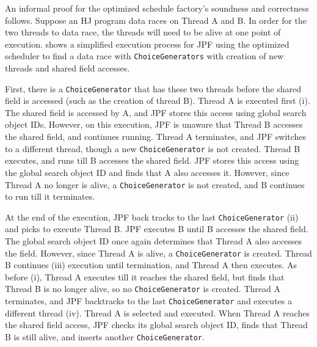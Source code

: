 
An informal proof for the optimized schedule factory's soundness and correctness follows. Suppose an HJ program data races on Thread A and B. In order for the two threads to data race, the threads will need to be alive at one point of execution.  shows a simplified execution process for JPF using the optimized scheduler to find a data race with \texttt{ChoiceGenerators} with creation of new threads and shared field accesses.

First, there is a \texttt{ChoiceGenerator} that has these two threads before the shared field is accessed (such as the creation of thread B). Thread A is executed first (i). The shared field is accessed by A, and JPF stores this access using global search object IDs. However, on this execution, JPF is unaware that Thread B accesses the shared field, and continues running. Thread A terminates, and JPF switches to a different thread, though a new \texttt{ChoiceGenerator} is not created. Thread B executes, and runs till B accesses the shared field. JPF stores this access using the global search object ID and finds that A also accesses it. However, since Thread A no longer is alive, a \texttt{ChoiceGenerator} is not created, and B continues to run till it terminates.

At the end of the execution, JPF back tracks to the last \texttt{ChoiceGenerator} (ii) and picks to execute Thread B. JPF executes B until B accesses the shared field. The global search object ID once again determines that Thread A also accesses the field. However, since Thread A is alive, a \texttt{ChoiceGenerator} is created. Thread B continues (iii) execution until termination, and Thread A then executes. As before (i), Thread A executes till it reaches the shared field, but finds that Thread B is no longer alive, so no \texttt{ChoiceGenerator} is created. Thread A terminates, and JPF backtracks to the last \texttt{ChoiceGenerator} and executes a different thread (iv). Thread A is selected and executed. When Thread A reaches the shared field access, JPF checks its global search object ID, finds that Thread B is still alive, and inserts another \texttt{ChoiceGenerator}.

